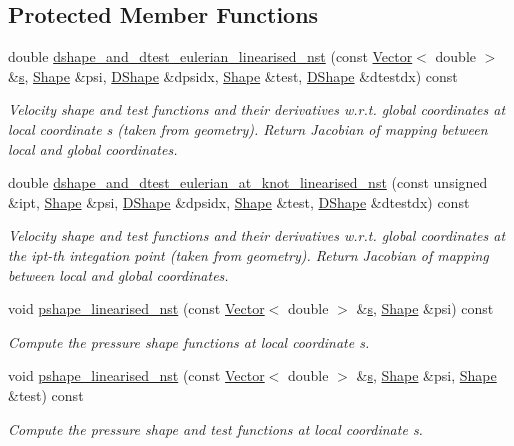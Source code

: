 \subsection*{Protected Member Functions}
\begin{DoxyCompactItemize}
\item 
double \hyperlink{classoomph_1_1LinearisedQCrouzeixRaviartElement_aa6112ad393ddc9e9a3639eef554173d0}{dshape\+\_\+and\+\_\+dtest\+\_\+eulerian\+\_\+linearised\+\_\+nst} (const \hyperlink{classoomph_1_1Vector}{Vector}$<$ double $>$ \&\hyperlink{cfortran_8h_ab7123126e4885ef647dd9c6e3807a21c}{s}, \hyperlink{classoomph_1_1Shape}{Shape} \&psi, \hyperlink{classoomph_1_1DShape}{D\+Shape} \&dpsidx, \hyperlink{classoomph_1_1Shape}{Shape} \&test, \hyperlink{classoomph_1_1DShape}{D\+Shape} \&dtestdx) const
\begin{DoxyCompactList}\small\item\em Velocity shape and test functions and their derivatives w.\+r.\+t. global coordinates at local coordinate s (taken from geometry). Return Jacobian of mapping between local and global coordinates. \end{DoxyCompactList}\item 
double \hyperlink{classoomph_1_1LinearisedQCrouzeixRaviartElement_ae3b60d3e296e3a17d3e1ef48356f8dc3}{dshape\+\_\+and\+\_\+dtest\+\_\+eulerian\+\_\+at\+\_\+knot\+\_\+linearised\+\_\+nst} (const unsigned \&ipt, \hyperlink{classoomph_1_1Shape}{Shape} \&psi, \hyperlink{classoomph_1_1DShape}{D\+Shape} \&dpsidx, \hyperlink{classoomph_1_1Shape}{Shape} \&test, \hyperlink{classoomph_1_1DShape}{D\+Shape} \&dtestdx) const
\begin{DoxyCompactList}\small\item\em Velocity shape and test functions and their derivatives w.\+r.\+t. global coordinates at the ipt-\/th integation point (taken from geometry). Return Jacobian of mapping between local and global coordinates. \end{DoxyCompactList}\item 
void \hyperlink{classoomph_1_1LinearisedQCrouzeixRaviartElement_ad90494427c784a07e843d88748c72cee}{pshape\+\_\+linearised\+\_\+nst} (const \hyperlink{classoomph_1_1Vector}{Vector}$<$ double $>$ \&\hyperlink{cfortran_8h_ab7123126e4885ef647dd9c6e3807a21c}{s}, \hyperlink{classoomph_1_1Shape}{Shape} \&psi) const
\begin{DoxyCompactList}\small\item\em Compute the pressure shape functions at local coordinate s. \end{DoxyCompactList}\item 
void \hyperlink{classoomph_1_1LinearisedQCrouzeixRaviartElement_ac159b94150d8c3ac032cc6be6ed579b1}{pshape\+\_\+linearised\+\_\+nst} (const \hyperlink{classoomph_1_1Vector}{Vector}$<$ double $>$ \&\hyperlink{cfortran_8h_ab7123126e4885ef647dd9c6e3807a21c}{s}, \hyperlink{classoomph_1_1Shape}{Shape} \&psi, \hyperlink{classoomph_1_1Shape}{Shape} \&test) const
\begin{DoxyCompactList}\small\item\em Compute the pressure shape and test functions at local coordinate s. \end{DoxyCompactList}\end{DoxyCompactItemize}
